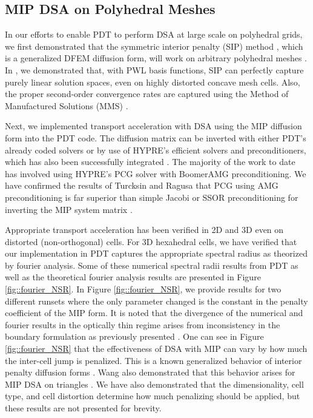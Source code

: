 \documentclass[11pt]{article}
\begin{document}
\subsection{MIP DSA on Polyhedral Meshes}
\label{sec::CW_MIP}

In our efforts to enable PDT to perform DSA at large scale on polyhedral grids, we first demonstrated that the symmetric interior penalty (SIP) method \cite{ragusa2015discontinuous}, which is a generalized DFEM diffusion form, will work on arbitrary polyhedral meshes \cite{ref::SIP_3D}. In \cite{ref::SIP_3D}, we demonstrated that, with PWL basis functions, SIP can perfectly capture purely linear solution spaces, even on highly distorted concave mesh cells. Also, the proper second-order convergence rates are captured using the Method of Manufactured Solutions (MMS) \cite{salari2000code}. 

Next, we implemented transport acceleration with DSA using the MIP diffusion form into the PDT code. The diffusion matrix can be inverted with either PDT's already coded solvers or by use of HYPRE's efficient solvers and preconditioners, which has also been successfully integrated \cite{ref::hypre}. The majority of the work to date has involved using HYPRE's PCG solver with BoomerAMG preconditioning. We have confirmed the results of Turcksin and Ragusa that PCG using AMG preconditioning is far superior than simple Jacobi or SSOR preconditioning for inverting the MIP system matrix \cite{turcksin2014discontinuous}.

Appropriate transport acceleration has been verified in 2D and 3D even on distorted (non-orthogonal) cells. For 3D hexahedral cells, we have verified that our implementation in PDT captures the appropriate spectral radius as theorized by fourier analysis. Some of these numerical spectral radii results from PDT as well as the theoretical fourier analysis results are presented in Figure \ref{fig::fourier_NSR}. In Figure \ref{fig::fourier_NSR}, we provide results for two different runsets where the only parameter changed is the constant  in the penalty coefficient of the MIP form. It is noted that the divergence of the numerical and fourier results in the optically thin regime arises from inconsistency in the boundary formulation as previously presented \cite{wang2009adaptive,ref::DSA_wang_ragusa}. One can see in Figure \ref{fig::fourier_NSR} that the effectiveness of DSA with MIP can vary by how much the inter-cell jump is penalized. This is a known generalized behavior of interior penalty diffusion forms \cite{arnold2002unified}. Wang also demonstrated that this behavior arises for MIP DSA on triangles \cite{wang2009adaptive}. We have also demonstrated that the dimensionality, cell type, and cell distortion determine how much penalizing should be applied, but these results are not presented for brevity.
\end{document}
